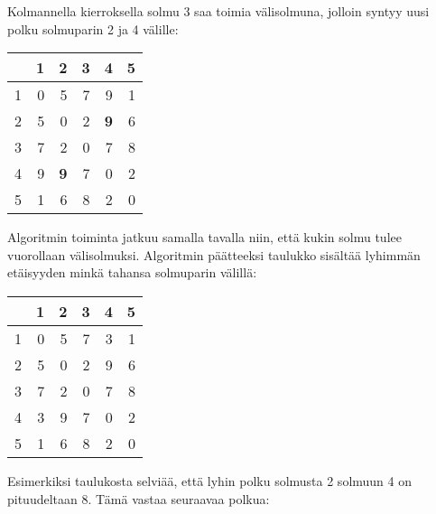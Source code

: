 Kolmannella kierroksella solmu 3 saa toimia välisolmuna,
jolloin syntyy uusi polku solmuparin 2 ja 4 välille:

\begin{center}
\begin{tabular}{r|rrrrr}
 & 1 & 2 & 3 & 4 & 5 \\
\hline
1 & 0 & 5 & 7 & 9 & 1 \\
2 & 5 & 0 & 2 & \textbf{9} & 6 \\
3 & 7 & 2 & 0 & 7 & 8 \\
4 & 9 & \textbf{9} & 7 & 0 & 2 \\
5 & 1 & 6 & 8 & 2 & 0 \\
\end{tabular}
\end{center}
\vspace{10pt}


Algoritmin toiminta jatkuu samalla tavalla
niin, että kukin solmu tulee vuorollaan
välisolmuksi.
Algoritmin päätteeksi taulukko sisältää
lyhimmän etäisyyden minkä tahansa
solmuparin välillä:

\begin{center}
\begin{tabular}{r|rrrrr}
 & 1 & 2 & 3 & 4 & 5 \\
\hline
1 & 0 & 5 & 7 & 3 & 1 \\
2 & 5 & 0 & 2 & 9 & 6 \\
3 & 7 & 2 & 0 & 7 & 8 \\
4 & 3 & 9 & 7 & 0 & 2 \\
5 & 1 & 6 & 8 & 2 & 0 \\
\end{tabular}
\end{center}

Esimerkiksi taulukosta selviää, että lyhin polku
solmusta 2 solmuun 4 on pituudeltaan 8.
Tämä vastaa seuraavaa polkua:

\begin{center}
\end{center}

